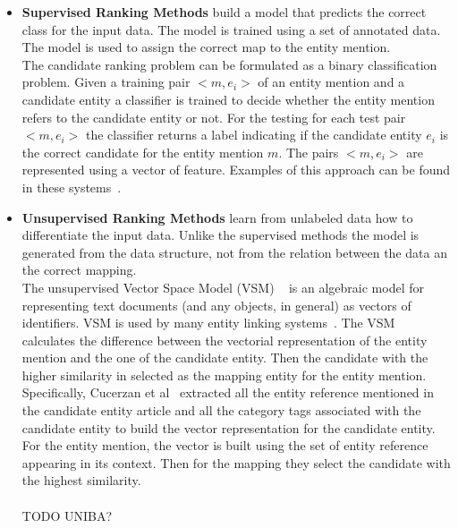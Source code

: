 \begin{itemize}[topsep=10pt]
\item \textbf{Supervised Ranking Methods} build a model that predicts the correct class for the input data. The model is trained using a set of annotated data. The model is used to assign the correct map to the entity mention.\\
\newline
The candidate ranking problem can be formulated as a binary classification problem. Given a training pair $<\!\!m, e_i\!\!>$ of an entity mention and a candidate entity a classifier is trained to decide whether the entity mention refers to the candidate entity or not. For the testing for each test pair $<\!\!m, e_i\!\!>$ the classifier returns a label indicating if the candidate entity $e_i$ is the correct candidate for the entity mention $m$. The pairs $<\!\!m, e_i\!\!>$ are represented using a vector of feature. Examples of this approach can be found in these systems~\cite{hoffart2011robust, guo2013link}.

\item \textbf{Unsupervised Ranking Methods} learn from unlabeled data how to differentiate the input data. Unlike the supervised methods the model is generated from the data structure, not from the relation between the data an the correct mapping. \\
\newline
The unsupervised Vector Space Model (VSM) ~\cite{salton1975vector} is an algebraic model for representing text documents (and any objects, in general) as vectors of identifiers. VSM is used by many entity linking systems~\cite{cucerzan2007large}. The VSM calculates the difference between the vectorial representation of the entity mention and the one of the candidate entity. Then the candidate with the higher similarity in selected as the mapping entity for the entity mention. Specifically, Cucerzan et al~\cite{cucerzan2007large} extracted all the entity reference mentioned in the candidate entity article and all the category tags associated with the candidate entity to build the vector representation for the candidate entity. For the entity mention, the vector is built using the set of entity reference appearing in its context. Then for the mapping they select the candidate with the highest similarity.
\\\\
TODO UNIBA?

\end{itemize}

